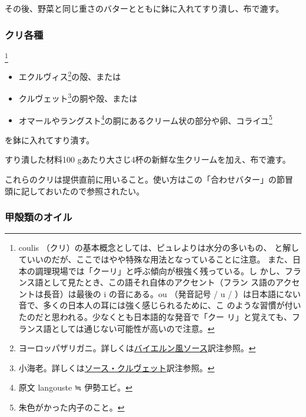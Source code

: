 \begin{recette}
その後、野菜と同じ重さのバターとともに鉢に入れてすり潰し、布で漉す。

\maeaki

\hypertarget{coulis-divers}{%
\subsubsection{クリ各種}\label{coulis-divers}}

\footnote{coulis
  （クリ）の基本概念としては、ピュレよりは水分の多いもの、
  と解していいのだが、ここではやや特殊な用法となっていることに注意。
  また、日本の調理現場では「クーリ」と呼ぶ傾向が根強く残っている。し
  かし、フランス語として見たとき、この語それ自体のアクセント（フラン
  ス語のアクセントは長音）は最後の i の音にある。ou （発音記号 / u /
  ）は日本語にない音で、多くの日本人の耳には強く感じられるために、こ
  のような習慣が付いたのだと思われる。少なくとも日本語的な発音で「クー
  リ」と覚えても、フランス語としては通じない可能性が高いので注意。}


\begin{itemize}
\item
  エクルヴィス\footnote{ヨーロッパザリガニ。詳しくは\protect\hyperlink{sauce-bavaroise}{バイエルン風ソース}訳注参照。}の殻、または
\item
  クルヴェット\footnote{小海老。詳しくは\protect\hyperlink{sauce-aux-crevettes}{ソース・クルヴェット}訳注参照。}の胴や殻、または
\item
  オマールやラングスト\footnote{原文 langouste ≒ 伊勢エビ。}の胴にあるクリーム状の部分や卵、コライユ\footnote{朱色がかった内子のこと。}
\end{itemize}

を鉢に入れてすり潰す。

すり潰した材料100 gあたり大さじ4杯の新鮮な生クリームを加え、布で漉す。

これらのクリは提供直前に用いること。使い方はこの「合わせバター」の節冒
頭に記しておいたので参照されたい。

\maeaki

\hypertarget{huile-de-crustaces}{%
\subsubsection{甲殻類のオイル}\label{huile-de-crustaces}}


\end{recette}
